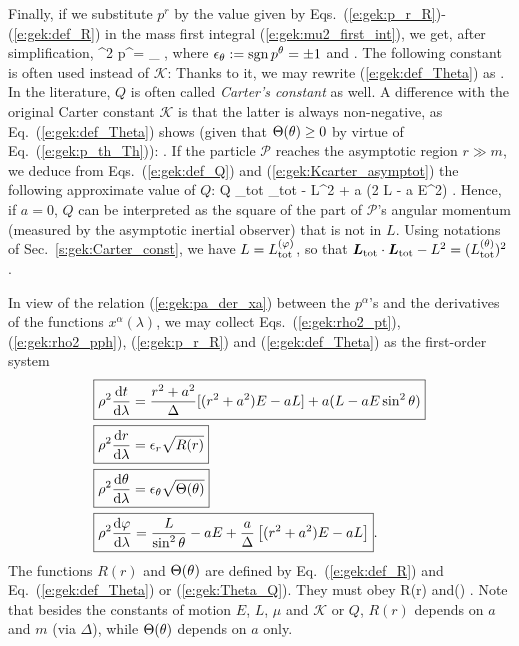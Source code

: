 Finally, if we substitute $p^r$ by the value given by Eqs.~(\ref{e:gek:p_r_R})-(\ref{e:gek:def_R}) in the mass first integral (\ref{e:gek:mu2_first_int}), we get, after simplification,
\be \label{e:gek:p_th_Th}
    \rho^2 p^\th = \eps_\th \sqrt{\Theta(\th)} ,
\ee
where $\epsilon_\theta := \operatorname{sgn} p^\theta = \pm 1$ and
\be \label{e:gek:def_Theta}
    .
\ee
The following constant is often used instead of $\mathscr{K}$:
\be \label{e:gek:def_Q}
\ee
Thanks to it, we may rewrite (\ref{e:gek:def_Theta}) as
\be \label{e:gek:Theta_Q}
     .
\ee
In the literature, $Q$ is often called \emph{Carter's constant} as well. A difference
with the original Carter constant $\mathscr{K}$ is that the latter is always non-negative,
as Eq.~(\ref{e:gek:def_Theta}) shows (given that $\Theta(\theta) \geq 0$ by virtue of
Eq.~(\ref{e:gek:p_th_Th})):
\be
      .
\ee
If the particle $\mathscr{P}$ reaches the asymptotic region $r\gg m$, we deduce from
Eqs.~(\ref{e:gek:def_Q}) and (\ref{e:gek:Kcarter_asymptot}) the following approximate
value of $Q$:
\be
   Q  _{\rm tot} \cdot {}_{\rm tot}
    - L^2 + a (2 L - a E^2) .
\ee
Hence, if $a=0$, $Q$ can be interpreted as the square of
the part of $\mathscr{P}$'s angular momentum (measured by the asymptotic inertial
observer) that is not in $L$. Using
notations of Sec.~\ref{s:gek:Carter_const}, we have $L = L_{\rm tot}^{(\varphi)}$,
so that $ \bm{L}_{\rm tot} \cdot \bm{L}_{\rm tot} - L^2 = (L_{\rm tot}^{(\theta)})^2$.

In view of the relation (\ref{e:gek:pa_der_xa}) between the $p^\alpha$'s
and the derivatives of the functions $x^\alpha(\lambda)$, we may
collect Eqs.~(\ref{e:gek:rho2_pt}), (\ref{e:gek:rho2_pph}), (\ref{e:gek:p_r_R})
and (\ref{e:gek:def_Theta}) as the first-order system
\begin{subequations}
\label{e:gek:eom_first_order}
\begin{align}
& \fbox{$\displaystyle  \rho^2 \frac{\mathrm{d} t}{\mathrm{d} \lambda} = \frac{r^2 + a^2}{\Delta} [(r^2 + a^2) E - a L] + a ( L - a E \sin^2\theta ) $} \label{e:gek:dtdl} \\
& \fbox{$\displaystyle  \rho^2 \frac{\mathrm{d} r}{\mathrm{d} \lambda} = \epsilon_r \sqrt{ R(r) } $} \label{e:gek:drdl}\\
& \fbox{$\displaystyle  \rho^2 \frac{\mathrm{d} \theta}{\mathrm{d} \lambda} = \epsilon_\theta \sqrt{\Theta(\theta)} $} \label{e:gek:dthdl}\\
& \fbox{$\displaystyle  \rho^2 \frac{\mathrm{d} \varphi}{\mathrm{d} \lambda}  = \frac{L}{\sin^2\theta} - a E
    + \frac{a}{\Delta}\left[(r^2 + a^2) E - a L\right] $} . \label{e:gek:dphdl}
\end{align}
\end{subequations}
The functions $R(r)$ and $\Theta(\theta)$ are defined by Eq.~(\ref{e:gek:def_R})
and Eq.~(\ref{e:gek:def_Theta}) or (\ref{e:gek:Theta_Q}). They must obey
\be \label{e:gek:R_Theta_positive}
    R(r)  \qquad\mbox{and}\qquad \Theta(\th)  .
\ee
Note that besides the constants of motion $E$, $L$, $\mu$ and $\mathscr{K}$
or $Q$, $R(r)$ depends on $a$ and $m$ (via $\Delta$), while $\Theta(\theta)$
depends on $a$ only.

